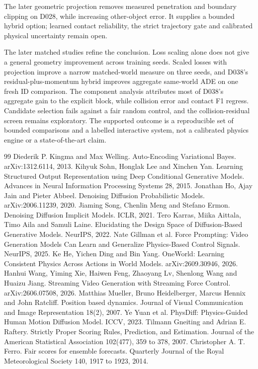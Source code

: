 \documentclass[11pt,a4paper]{article}
\begin{document}
The later geometric projection removes measured penetration and boundary clipping
on D028, while increasing other-object error. It supplies a bounded hybrid
option; learned contact reliability, the strict trajectory gate and calibrated
physical uncertainty remain open.

The later matched studies refine the conclusion. Loss scaling alone does
not give a general geometry improvement across training seeds. Scaled losses
with projection improve a narrow matched-world measure on three seeds, and
D038's residual-plus-momentum hybrid improves aggregate same-world ADE on
one fresh ID comparison. The component analysis attributes most of D038's
aggregate gain to the explicit block, while collision error and contact F1
regress. Candidate selection fails against a fair random control, and the
collision-residual screen remains exploratory. The supported outcome is a
reproducible set of bounded comparisons and a labelled interactive system,
not a calibrated physics engine or a state-of-the-art claim.

\clearpage
\begin{thebibliography}{99}
 Diederik P. Kingma and Max Welling. Auto-Encoding Variational Bayes. arXiv:1312.6114, 2013.
 Kihyuk Sohn, Honglak Lee and Xinchen Yan. Learning Structured Output Representation using Deep Conditional Generative Models. Advances in Neural Information Processing Systems 28, 2015.
 Jonathan Ho, Ajay Jain and Pieter Abbeel. Denoising Diffusion Probabilistic Models. arXiv:2006.11239, 2020.
 Jiaming Song, Chenlin Meng and Stefano Ermon. Denoising Diffusion Implicit Models. ICLR, 2021.
 Tero Karras, Miika Aittala, Timo Aila and Samuli Laine. Elucidating the Design Space of Diffusion-Based Generative Models. NeurIPS, 2022.
 Nate Gillman et al. Force Prompting: Video Generation Models Can Learn and Generalize Physics-Based Control Signals. NeurIPS, 2025.
 Ke He, Yichen Ding and Bin Yang. OneWorld: Learning Consistent Physics Across Actions in World Models. arXiv:2609.30946, 2026.
 Hanhui Wang, Yiming Xie, Haiwen Feng, Zhaoyang Lv, Shenlong Wang and Huaizu Jiang. Streaming Video Generation with Streaming Force Control. arXiv:2606.07508, 2026.
 Matthias Mueller, Bruno Heidelberger, Marcus Hennix and John Ratcliff. Position based dynamics. Journal of Visual Communication and Image Representation 18(2), 2007.
 Ye Yuan et al. PhysDiff: Physics-Guided Human Motion Diffusion Model. ICCV, 2023.
 Tilmann Gneiting and Adrian E. Raftery. Strictly Proper Scoring Rules, Prediction, and Estimation. Journal of the American Statistical Association 102(477), 359 to 378, 2007.
 Christopher A. T. Ferro. Fair scores for ensemble forecasts. Quarterly Journal of the Royal Meteorological Society 140, 1917 to 1923, 2014.
\end{thebibliography}
\end{document}
